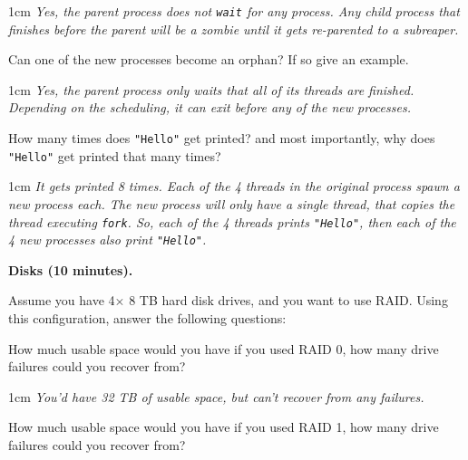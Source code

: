 \documentclass[12pt]{article}
\newenvironment{answer}{\begin{adjustwidth}{1cm}{}\itshape}{\end{adjustwidth}}
\begin{document}
\begin{answer}
  Yes, the parent process does not \texttt{wait} for any process.
  Any child process that finishes before the parent will be a zombie until
  it gets re-parented to a subreaper.
\end{answer}

\vspace{1em}

Can one of the new processes become an orphan? If so give an example.

\begin{answer}
  Yes, the parent process only waits that all of its threads are finished.
  Depending on the scheduling, it can exit before any of the new processes.
\end{answer}

\vspace{1em}

How many times does \lstinline|"Hello"| get printed? and most importantly, why
does \lstinline|"Hello"| get printed that many times?

\begin{answer}
  It gets printed 8 times. Each of the 4 threads in the original process spawn
  a new process each. The new process will only have a single thread, that
  copies the thread executing \lstinline|fork|. So, each of the 4 threads prints
  \lstinline|"Hello"|, then each of the 4 new processes also print
  \lstinline|"Hello"|. 
\end{answer}

\newpage

\textbf{Disks (10 minutes).}

\vspace{1em}

Assume you have 4$\times$ 8 TB hard disk drives, and you want to use RAID.
Using this configuration, answer the following questions:

\vspace{1em}

How much usable space would you have if you used RAID 0, how many drive
failures could you recover from?

\begin{answer}
  You'd have 32 TB of usable space, but can't recover from any failures.
\end{answer}

\vspace{1em}

How much usable space would you have if you used RAID 1, how many drive
failures could you recover from?
\end{document}
